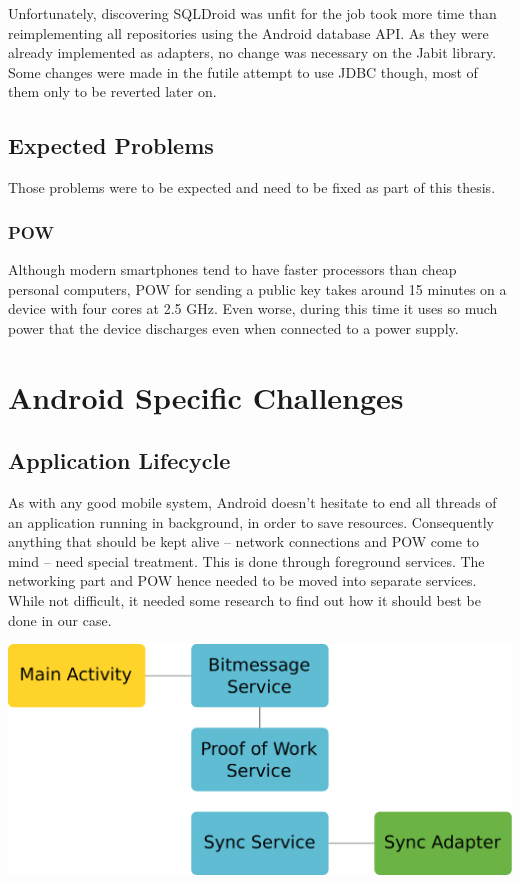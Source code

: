 \documentclass{bfh}
\begin{document}
  Unfortunately, discovering SQLDroid was unfit for the job took more time than reimplementing all repositories using the Android database API. As they were already implemented as adapters, no change was necessary on the Jabit library. Some changes were made in the futile attempt to use JDBC though, most of them only to be reverted later on.

  \subsection{Expected Problems}
  Those problems were to be expected and need to be fixed as part of this thesis.

  \subsubsection{\acl{POW}}
  Although modern smartphones tend to have faster processors than cheap personal computers, \ac{POW} for sending a public key takes around 15 minutes on a device with four cores at 2.5 GHz. Even worse, during this time it uses so much power that the device discharges even when connected to a power supply.

  \section{Android Specific Challenges}
  \subsection{Application Lifecycle}
  As with any good mobile system, Android doesn't hesitate to end all threads of an application running in background, in order to save resources. Consequently anything that should be kept alive -- network connections and \ac{POW} come to mind -- need special treatment. This is done through foreground services. The networking part and \ac{POW} hence needed to be moved into separate services. While not difficult, it needed some research to find out how it should best be done in our case.

  \begin{center}
    \includegraphics[width=0.6 \textwidth]{images/services.pdf}
  \end{center}
\end{document}
